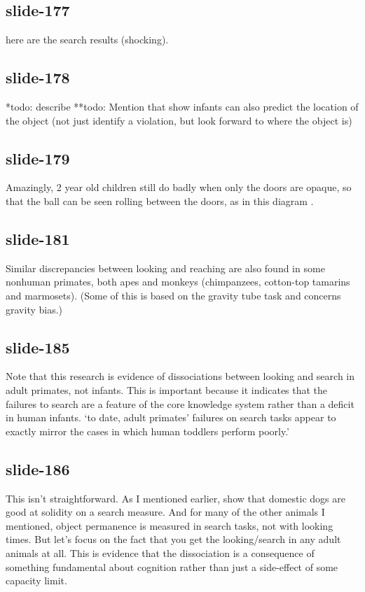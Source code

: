 \documentclass[12pt,\papersize]{extarticle}
\begin{document}
 
\subsection{slide-177}
here are the search results (shocking).
 
 
\subsection{slide-178}
*todo: describe
**todo: Mention that \citep{mash:2006_what} show infants can also predict the location of the object (not just identify a violation, but look forward to where the object is)
 
 
\subsection{slide-179}
Amazingly, 2 year old children still do badly when only the doors are opaque, so that the ball can be seen rolling between the doors, as in this diagram \citep{Butler:2002bv}.
 
 
\subsection{slide-181}
Similar discrepancies between looking and reaching are also found in some nonhuman primates,
both apes and monkeys (chimpanzees, cotton-top tamarins and marmosets).
(Some of this is based on the gravity tube task and concerns gravity bias.)
 
 
\subsection{slide-185}
Note that this research is evidence of dissociations between looking and search in adult primates, not infants.
This is important because it indicates that the failures to search are a feature of the core knowledge system rather than a deficit in human infants.
‘to date, adult primates’ failures on search tasks appear to exactly mirror the cases in which human toddlers perform poorly.’
\citep[p.\ 17]{santos:2009_object}
 
 
\subsection{slide-186}
This isn't straightforward.
As I mentioned earlier, \citep{kundey:2010_domesticated} show that domestic dogs are good at solidity on a search measure.
And for many of the other animals I mentioned, object permanence is measured in search tasks, not with looking times.
But let's focus on the fact that you get the looking/search in any adult animals at all.
This is evidence that the dissociation is a consequence of something fundamental about cognition rather than just a side-effect of some capacity limit.
 
\end{document}
